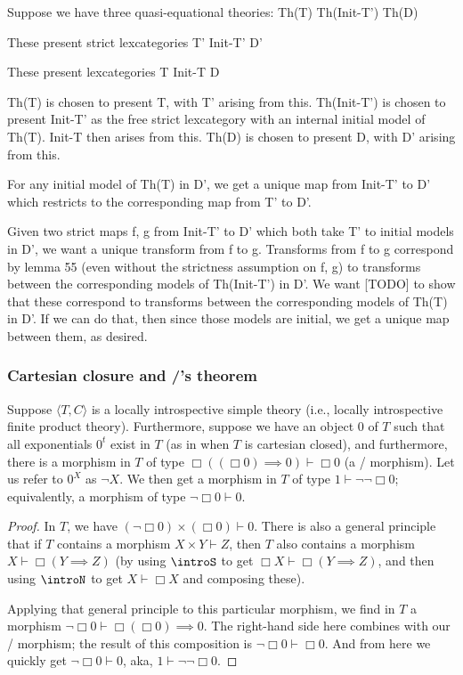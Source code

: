 Suppose we have three quasi-equational theories:
Th(T)
Th(Init-T')
Th(D)

These present strict lexcategories
T'
Init-T'
D'

These present lexcategories
T
Init-T
D

Th(T) is chosen to present T, with T' arising from this.
Th(Init-T') is chosen to present Init-T' as the free strict lexcategory with an internal initial model of Th(T). Init-T then arises from this.
Th(D) is chosen to present D, with D' arising from this.

For any initial model of Th(T) in D', we get a unique map from Init-T' to D' which restricts to the corresponding map from T' to D'.

Given two strict maps f, g from Init-T' to D' which both take T' to initial models in D', we want a unique transform from f to g. Transforms from f to g correspond by lemma 55 (even without the strictness assumption on f, g) to transforms between the corresponding models of Th(Init-T') in D'. We want [TODO] to show that these correspond to transforms between the corresponding models of Th(T) in D'. If we can do that, then since those models are initial, we get a unique map between them, as desired.


\subsubsection{Cartesian closure and \Loeb/'s theorem}
\begin{theorem}
Suppose $\langle T, C \rangle$ is a locally introspective simple theory (i.e., locally introspective finite product theory). Furthermore, suppose we have an object $0$ of $T$ such that all exponentials $0^t$ exist in $T$ (as in when $T$ is cartesian closed), and furthermore, there is a morphism in $T$ of type $\Box ((\Box 0) \implies 0) \vdash \Box 0$ (a \Loeb/ morphism). Let us refer to $0^X$ as $\neg X$. We then get a morphism in $T$ of type $1 \vdash \neg \neg \Box 0$; equivalently, a morphism of type $\neg \Box 0 \vdash 0$.
\end{theorem}
\begin{proof}
In $T$, we have $(\neg \Box 0) \times (\Box 0) \vdash 0$. There is also a general principle that if $T$ contains a morphism $X \times Y \vdash Z$, then $T$ also contains a morphism $X \vdash \Box (Y \implies Z)$ (by using $\introS$ to get $\Box X \vdash \Box(Y \implies Z)$, and then using $\introN$ to get $X \vdash \Box X$ and composing these).

Applying that general principle to this particular morphism, we find in $T$ a morphism $\neg \Box 0 \vdash \Box (\Box 0) \implies 0$. The right-hand side here combines with our \Loeb/ morphism; the result of this composition is $\neg \Box 0 \vdash \Box 0$. And from here we quickly get $\neg \Box 0 \vdash 0$, aka, $1 \vdash \neg \neg \Box 0$.
\end{proof}

